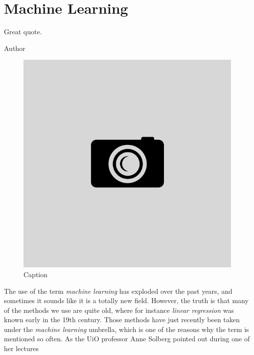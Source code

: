 \chapter{Machine Learning} \label{chp:machinelearning}
\epigraph{Great quote.}{Author}
\begin{figure}[H]
	\centering
	\includegraphics[scale=0.4]{Images/example.png}
	\caption{Caption}
\end{figure}

The use of the term \textit{machine learning} has exploded over the past years, and sometimes it sounds like it is a totally new field. However, the truth is that many of the methods we use are quite old, where for instance \textit{linear regression} was known early in the 19th century. \cite{legendre_nouvelles_1805}\cite{gauss_theoria_1809} Those methods have just recently been taken under the \textit{machine learning} umbrella, which is one of the reasons why the term is mentioned so often. As the UiO professor Anne Solberg pointed out during one of her lectures\\

